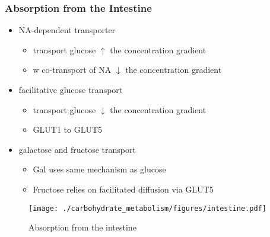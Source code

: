 \documentclass{scrartcl}
\begin{document}
\subsubsection{Absorption from the Intestine}
\label{sec:org9fb042e}
\begin{itemize}
\item NA-dependent transporter
\begin{itemize}
\item transport glucose \(\uparrow\) the concentration gradient
\item w co-transport of NA \(\downarrow\) the concentration gradient
\end{itemize}
\item facilitative glucose transport
\begin{itemize}
\item transport glucose \(\downarrow\) the concentration gradient
\item GLUT1 to GLUT5
\end{itemize}
\item galactose and fructose transport
\begin{itemize}
\item Gal uses same mechanism as glucose
\item Fructose relies on facilitated diffusion via GLUT5
\end{itemize}
\end{itemize}

\begin{figure}[htbp]
\centering
\texttt{[image: ./carbohydrate\_metabolism/figures/intestine.pdf]}
\caption{\label{fig:org2fed85c}
Absorption from the intestine}
\end{figure}
\end{document}
